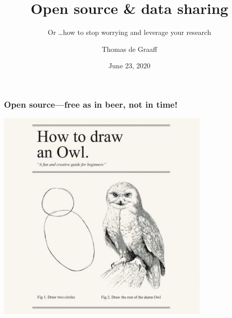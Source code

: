 \documentclass[ignorenonframetext]{beamer}
\title{Open source \& data sharing}
\subtitle{Or \ldots how to stop worrying and leverage your research}
\author{Thomas de Graaff}
\institute{Department of Spatial Economics}
\date{June 23, 2020}
\begin{document}
\frame{\titlepage}

\begin{frame}
  \frametitle{Open source---free as in beer, not in time!}
    \centering
    \includegraphics[width = 0.78\textwidth]{owl.jpg}
  \end{frame}
\end{document}
